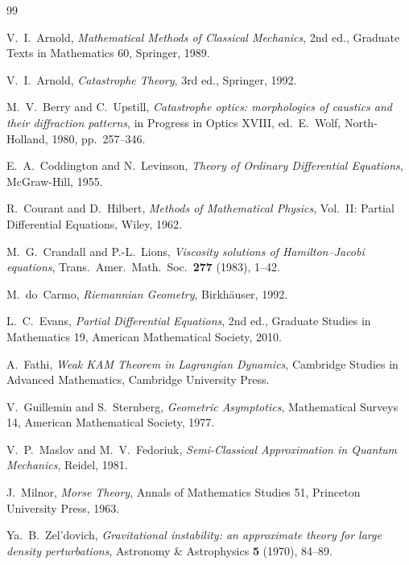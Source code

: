 \documentclass[11pt]{article}
\theoremstyle{plain}
\theoremstyle{definition}
\theoremstyle{remark}
\begin{document}
\begin{thebibliography}{99}

 V.~I.~Arnold, \emph{Mathematical Methods of Classical
    Mechanics}, 2nd ed., Graduate Texts in Mathematics 60, Springer, 1989.

 V.~I.~Arnold, \emph{Catastrophe Theory}, 3rd ed., Springer, 1992.

 M.~V.~Berry and C.~Upstill, \emph{Catastrophe optics:
    morphologies of caustics and their diffraction patterns}, in Progress in
        Optics XVIII, ed.\ E.\ Wolf, North-Holland, 1980, pp.~257--346.

 E.~A.~Coddington and N.~Levinson, \emph{Theory of
    Ordinary Differential Equations}, McGraw-Hill, 1955.

 R.~Courant and D.~Hilbert, \emph{Methods of
    Mathematical Physics}, Vol.~II: Partial Differential Equations, Wiley,
        1962.

 M.~G.~Crandall and P.-L.~Lions, \emph{Viscosity
    solutions of Hamilton--Jacobi equations}, Trans.\ Amer.\ Math.\ Soc.\
        \textbf{277} (1983), 1--42.

 M.~do~Carmo, \emph{Riemannian Geometry}, Birkh\"auser, 1992.

 L.~C.~Evans, \emph{Partial Differential Equations}, 2nd ed.,
    Graduate Studies in Mathematics 19, American Mathematical Society, 2010.

 A.~Fathi, \emph{Weak KAM Theorem in Lagrangian Dynamics},
    Cambridge Studies in Advanced Mathematics, Cambridge University Press.

 V.~Guillemin and S.~Sternberg, \emph{Geometric
    Asymptotics}, Mathematical Surveys 14, American Mathematical Society, 1977.

 V.~P.~Maslov and M.~V.~Fedoriuk, \emph{Semi-Classical
    Approximation in Quantum Mechanics}, Reidel, 1981.

 J.~Milnor, \emph{Morse Theory}, Annals of Mathematics Studies
    51, Princeton University Press, 1963.

 Ya.~B.~Zel'dovich, \emph{Gravitational instability: an
    approximate theory for large density perturbations}, Astronomy \&
        Astrophysics \textbf{5} (1970), 84--89.

\end{thebibliography}
\end{document}
